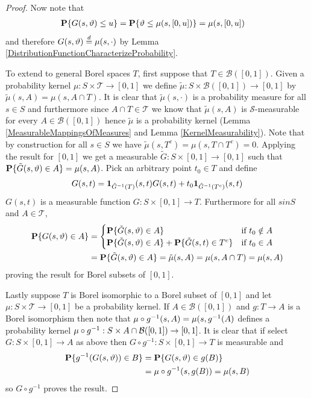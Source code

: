 \begin{proof}
Now note that
\begin{align*}
\textbf{P}\{ G(s,\vartheta) \leq u \} &= \textbf{P}\{\vartheta \leq
  \mu(s,[0,u])\} = \mu(s,[0,u])
\end{align*}
and therefore $G(s,\vartheta) \overset{d}= \mu(s,\cdot)$ by Lemma \ref{DistributionFunctionCharacterizeProbability}.

To extend to general Borel spaces $T$, first suppose that $T \in
\mathcal{B}([0,1])$.  Given a probability kernel $\mu : S \times \mathcal{T}
\to [0,1]$ we define $\tilde{\mu} : S \times \mathcal{B}([0,1]) \to
[0,1]$ by $\tilde{\mu}(s, A) = \mu(s, A \cap T)$.  It is clear that
$\tilde{\mu}(s, \cdot)$ is a probability measure for all $s \in S$ and
furthermore since $A \cap T \in \mathcal{T}$ we know that
$\tilde{\mu}(s, A)$ is $\mathcal{S}$-measurable for every $A \in
\mathcal{B}([0,1])$ hence $\tilde{\mu}$ is a probability kernel (Lemma
\ref{MeasurableMappingsOfMeasures} and Lemma \ref{KernelMeasurability}).  Note
that by construction for all $s \in S$ we have $\tilde{\mu}(s, T^c) =
\mu(s, T \cap T^c) = 0$.
Applying the result for $[0,1]$ we get a measurable $\tilde{G} : S \times
[0,1] \to [0,1]$ such that $\textbf{P}\{ \tilde{G}(s,\vartheta) \in A
\} = \mu(s, A)$.  Pick an arbitrary point $t_0 \in T$ and define 
\begin{align*}
G(s,t) = \textbf{1}_{\tilde{G}^{-1}(T)}(s,t) G(s,t) + t_0 \textbf{1}_{\tilde{G}^{-1}(T^c)}(s,t)
\end{align*}
$G(s,t)$ is a measurable function $G : S \times [0,1]
\to T$.  Furthermore for all $s in S$ and $A \in \mathcal{T}$, 
\begin{align*}
\textbf{P}\{G(s, \vartheta) \in A\} &= \begin{cases}
\textbf{P}\{\tilde{G}(s, \vartheta) \in A \} & \text{if $t_0 \notin A$} \\
\textbf{P}\{\tilde{G}(s, \vartheta) \in A \} +
\textbf{P}\{\tilde{G}(s,t) \in T^c\} & \text{if $t_0 \in A$}
\end{cases} \\
&= \textbf{P}\{\tilde{G}(s,\vartheta) \in A\} = \tilde{\mu}(s, A) = \mu(s, A \cap T) = \mu(s,A)
\end{align*}
proving the result for Borel subsets of $[0,1]$.

Lastly suppose $T$ is Borel isomorphic to a Borel subset of $[0,1]$
and let $\mu: S \times \mathcal{T} \to [0,1]$ be a probability
kernel.  If $A \in \mathcal{B}([0,1])$ and $g : T \to A$ is a Borel
isomorphism then note that $\mu \circ g^{-1}(s, A) = \mu(s,
g^{-1}(A)$ defines a probability kernel $\mu \circ g^{-1} : S
\times A \cap \mathcal{B}([0,1]) \to [0,1]$.  It is clear that if
select $G : S \times [0,1] \to A$ as above then $G \circ g^{-1} : S
\times [0,1] \to T$ is measurable and 
\begin{align*}
\textbf{P}\{g^{-1}(G(s, \vartheta)) \in B \} &= \textbf{P}\{G(s,
  \vartheta) \in g(B) \} \\
&=\mu \circ g^{-1}(s, g(B)) = \mu(s, B)
\end{align*}
so $G \circ g^{-1}$ proves the result.
\end{proof}

